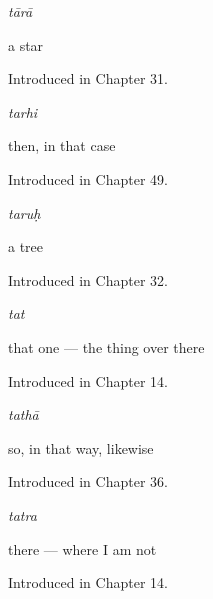 \noindent\begin{minipage}[t]{\linewidth}
\raggedright
\textbf{}\enspace\emph{tārā}\par
\small a star\par
\footnotesize Introduced in Chapter 31.
\end{minipage}\par\medskip

\noindent\begin{minipage}[t]{\linewidth}
\raggedright
\textbf{}\enspace\emph{tarhi}\par
\small then, in that case\par
\footnotesize Introduced in Chapter 49.
\end{minipage}\par\medskip

\noindent\begin{minipage}[t]{\linewidth}
\raggedright
\textbf{}\enspace\emph{taruḥ}\par
\small a tree\par
\footnotesize Introduced in Chapter 32.
\end{minipage}\par\medskip

\noindent\begin{minipage}[t]{\linewidth}
\raggedright
\textbf{}\enspace\emph{tat}\par
\small that one — the thing over there\par
\footnotesize Introduced in Chapter 14.
\end{minipage}\par\medskip

\noindent\begin{minipage}[t]{\linewidth}
\raggedright
\textbf{}\enspace\emph{tathā}\par
\small so, in that way, likewise\par
\footnotesize Introduced in Chapter 36.
\end{minipage}\par\medskip

\noindent\begin{minipage}[t]{\linewidth}
\raggedright
\textbf{}\enspace\emph{tatra}\par
\small there — where I am not\par
\footnotesize Introduced in Chapter 14.
\end{minipage}\par\medskip

